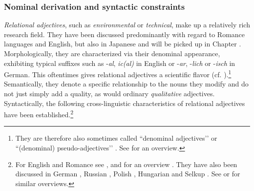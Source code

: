 \documentclass [output=book,colorlinks,citecolor=brown]{langscibook}
\begin{document}
\subsubsection{Nominal derivation and syntactic constraints}

\textit{Relational adjectives}, such as \textit{environmental} or \textit{technical}, make up a relatively rich research field. They have been discussed predominantly with regard to Romance languages and English, but also in Japanese \citep{bisetto:2010:RA, nagano:2015:RA, nagano:2016:are, nagano:2018:conversion, shimada:2018:relational, morita:2010:internal, morita:2011:three, morita:2013:morph} and will be picked up in Chapter . Morphologically, they are characterized via their denominal appearance, exhibiting typical suffixes such as -\textit{al}, \textit{ic(al)} in English or -\textit{ar}, -\textit{lich} or -\textit{isch} in German. This oftentimes gives relational adjectives a scientific flavor (cf. \citealt{gunkel:2008:constraints}).\footnote{They are therefore also sometimes called ``denominal adjectives’’ or ``(denominal) pseudo-adjectives’’ \citep{postal:1969:anaphoric, bartning:1980:remarques}. See \citet[52–56]{bortolotto:2016:RA} for an overview.} Semantically, they denote a specific relationship to the nouns they modify and do not just simply add a quality, as would ordinary \textit{qualitative} adjectives. Syntactically, the following cross-linguistic characteristics of relational adjectives have been established.\footnote{For English and Romance see \citet{postal:1969:anaphoric, downing:1977:creation, levi:1978:syntax, bartning:1980:remarques, bartning:1984:aspects, bartning:1986:paralelisme, warren:1984:classifying, bosque:1993:sobre, bosque:1996:postnominal, mcnally:2004:relational, fabregas:2007:internal, fabregas:2014:adjectival, gunkel:2008:constraints, roy:2010:deadjectival, zifonun:2011:RA, rainer:2013:can, bortolotto:2016:RA}, and for an overview \citet[Chapters 3.3 and 9.2]{alex:2007:nounphrase}. They have also been discussed in German \citep{hotzen:1967:gegenwart, schaublin:1972:probleme, eichinger:1979:syntaktische, frevel:2005:RA, trost:2006:das}, Russian \citep{mezhevich:2002:english}, Polish \citep{cetnarowska:2015:categorial}, Hungarian \citep{kenesei:2014:on} and Selkup \citep{spencer:2017:denominal, nikolaeva:2020:mixed}. See \citet[44]{nagano:2016:are} or \citet[ch. 2.3]{bortolotto:2016:RA} for similar overviews.} %
\end{document}

